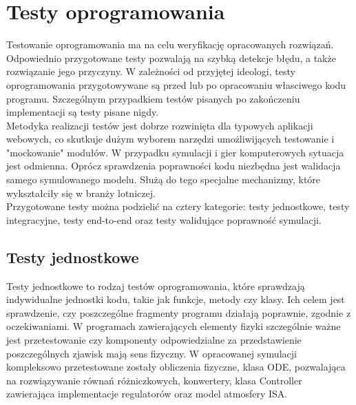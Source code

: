 \documentclass[15pt]{sprawozdanie}
\begin{document}
\begin{table}[!h]
\caption{Analiza SWOT}
\label{swot}
\end{table}

\newpage
\section{Testy oprogramowania}

Testowanie oprogramowania ma na celu weryfikację opracowanych rozwiązań. Odpowiednio przygotowane testy pozwalają na szybką detekcje błędu, a także rozwiązanie jego przyczyny. W zależności od przyjętej ideologi, testy oprogramowania przygotowywane są przed lub po opracowaniu własciwego kodu programu. Szczególnym przypadkiem testów pisanych po zakończeniu implementacji są testy pisane nigdy.\\

Metodyka realizacji testów jest dobrze rozwinięta dla typowych aplikacji webowych, co skutkuje dużym wyborem narzędzi umożliwijących testowanie i "mockowanie" modułów. W przypadku symulacji i gier komputerowych sytuacja jest odmienna. Oprócz sprawdzenia poprawności kodu niezbędna jest walidacja samego symulowanego modelu. Służą do tego specjalne mechanizmy, które wykształciły się w branży lotniczej.\\

Przygotowane testy można podzielić na cztery kategorie: testy jednostkowe, testy integracyjne, testy end-to-end oraz testy walidujące poprawność symulacji.

\subsection{Testy jednostkowe}

Testy jednostkowe to rodzaj testów oprogramowania, które sprawdzają indywidualne jednostki kodu, takie jak funkcje, metody czy klasy. Ich celem jest sprawdzenie, czy poszczególne fragmenty programu działają poprawnie, zgodnie z oczekiwaniami.
W programach zawierających elementy fizyki szczególnie ważne jest przetestowanie czy komponenty odpowiedzialne za przedstawienie poszczególnych zjawisk mają sens fizyczny.
W opracowanej symulacji kompleksowo przetestowane zostały obliczenia fizyczne, klasa ODE, pozwalająca na rozwiązywanie równań różniczkowych, konwertery, klasa Controller zawierająca implementacje regulatorów oraz model atmosfery ISA. 
\end{document}
